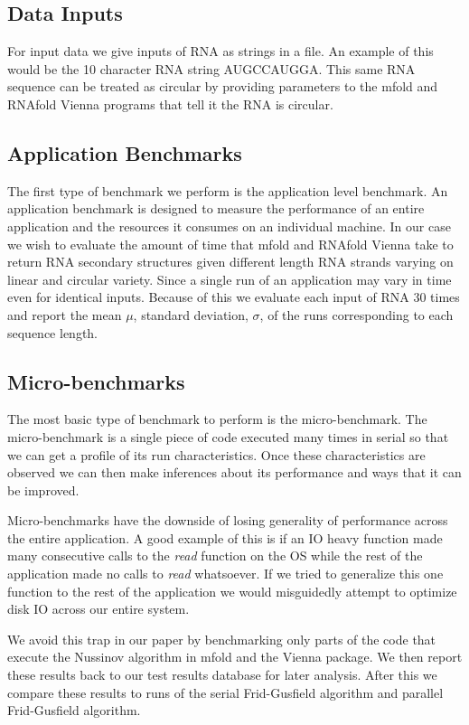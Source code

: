 \documentclass[12pt]{article}
\begin{document}
\subsection{Data Inputs}
\par For input data we give inputs of RNA as strings in a file. An example of this
would be the 10 character RNA string AUGCCAUGGA. This same RNA sequence can be
treated as circular by providing parameters to the mfold and RNAfold Vienna
programs that tell it the RNA is circular\cite{mfold-manual, vienna-manual}.
\subsection{Application Benchmarks}
\par The first type of benchmark we perform is the application level benchmark.
An application benchmark is designed to measure the performance of an entire
application and the resources it consumes on an individual machine\cite{jain}.
In our case we wish to evaluate the amount of time that mfold and RNAfold Vienna
take to return RNA secondary structures given different length RNA strands varying
on linear and circular variety. Since a single run of an application may vary in
time even for identical inputs. Because of this we evaluate each input of RNA 30
times and report the mean $\mu$, standard deviation, $\sigma$, of the runs
corresponding to each sequence length.

\subsection{Micro-benchmarks}
\par The most basic type of benchmark to perform is the micro-benchmark. The
micro-benchmark is a single piece of code executed many times in serial so that
we can get a profile of its run characteristics\cite{eulogy,sysperformance}.
Once these characteristics are observed we can then make inferences about its
performance and ways that it can be improved.
\par Micro-benchmarks have the downside
of losing generality of performance across the entire application\cite{eulogy, sysperformance}.
A good example of this is if an IO heavy function made many consecutive calls to
the \textit{read} function on the OS while the rest of the application made no
calls to \textit{read} whatsoever. If we tried to generalize this one function to
the rest of the application we would misguidedly attempt to optimize disk IO
across our entire system.
\par We avoid this trap in our paper by benchmarking only parts of the code that
execute the Nussinov algorithm in mfold and the Vienna package. We then report
these results back to our test results database for later analysis. After this we
compare these results to runs of the serial Frid-Gusfield algorithm and parallel
Frid-Gusfield algorithm.
\end{document}
